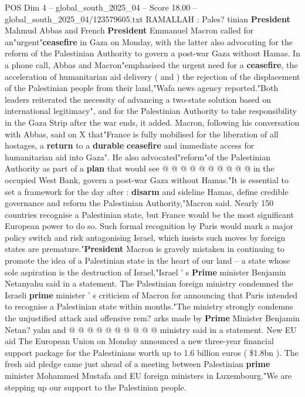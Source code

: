 \begin{textsample}{POS Dim 4 – global\_south\_2025\_04 – Score 18.00 – global\_south\_2025\_04/123579605.txt}  \label{ex:f4_pos_249}
RAMALLAH : Pales? tinian \textbf{President} Mahmud Abbas and French \textbf{President} Emmanuel Macron called for an"urgent"\textbf{ceasefire} in Gaza on Monday, with the latter also advocating for the reform of the Palestinian Authority to govern a post-war Gaza without Hamas.
In a phone call, Abbas and Macron"emphasised the urgent need for a \textbf{ceasefire}, the acceleration of humanitarian aid delivery ( and ) the rejection of the displacement of the Palestinian people from their land,"Wafa news agency reported."Both leaders reiterated the necessity of advancing a two-state solution based on international legitimacy", and for the Palestinian Authority to take responsibility in the Gaza Strip after the war ends, it added.
Macron, following his conversation with Abbas, said on X that"France is fully mobilised for the liberation of all hostages, a \textbf{return} to a \textbf{durable} \textbf{ceasefire} and immediate access for humanitarian aid into Gaza".
He also advocated"reform"of the Palestinian Authority as part of a \textbf{plan} that would see @ @ @ @ @ @ @ @ @ @ in the occupied West Bank, govern a post-war Gaza without Hamas."It is essential to set a framework for the day after : \textbf{disarm} and sideline Hamas, define credible governance and reform the Palestinian Authority,"Macron said.
Nearly 150 countries recognise a Palestinian state, but France would be the most significant European power to do so.
Such formal recognition by Paris would mark a major policy switch and risk antagonising Israel, which insists such moves by foreign states are premature."\textbf{President} Macron is gravely mistaken in continuing to promote the idea of a Palestinian state in the heart of our land -- a state whose sole aspiration is the destruction of Israel,"Israel ' s \textbf{Prime} minister Benjamin Netanyahu said in a statement.
The Palestinian foreign ministry condemned the Israeli \textbf{prime} minister ' s criticism of Macron for announcing that Paris intended to recognise a Palestinian state within months."The ministry strongly condemns the unjustified attack and offensive rem? arks made by \textbf{Prime} Minister Benjamin Netan? yahu and @ @ @ @ @ @ @ @ @ @ ministry said in a statement.
New EU aid The European Union on Monday announced a new three-year financial support package for the Palestinians worth up to 1.6 billion euros ( \$1.8bn ).
The fresh aid pledge came just ahead of a meeting between Palestinian \textbf{prime} minister Mohammed Mustafa and EU foreign ministers in Luxembourg."We are stepping up our support to the Palestinian people.

\end{textsample}
